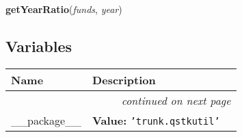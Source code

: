     \vspace{0.5ex}

\hspace{.8\funcindent}\begin{boxedminipage}{\funcwidth}

    \raggedright \textbf{getYearRatio}(\textit{funds}, \textit{year})

\setlength{\parskip}{2ex}
\setlength{\parskip}{1ex}
    \end{boxedminipage}



  \subsection{Variables}

    \vspace{-1cm}
\hspace{\varindent}\begin{longtable}{|p{\varnamewidth}|p{\vardescrwidth}|l}
\cline{1-2}
\cline{1-2} \centering \textbf{Name} & \centering \textbf{Description}& \\
\cline{1-2}
\endhead\cline{1-2}\multicolumn{3}{r}{\small\textit{continued on next page}}\\\endfoot\cline{1-2}
\endlastfoot\raggedright \_\-\_\-p\-a\-c\-k\-a\-g\-e\-\_\-\_\- & \raggedright \textbf{Value:} 
{\tt \texttt{'}\texttt{trunk.qstkutil}\texttt{'}}&\\
\cline{1-2}
\end{longtable}

